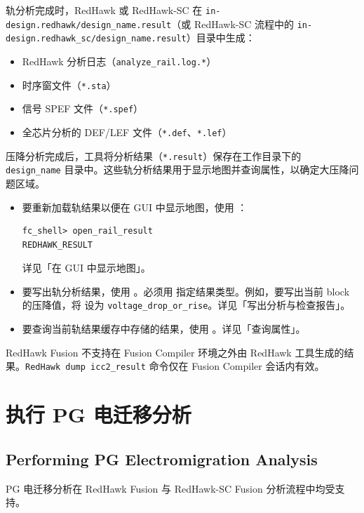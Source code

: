 轨分析完成时，RedHawk 或 RedHawk-SC 在 \texttt{in-design.redhawk/design\_name.result}（或 RedHawk-SC 流程中的 \texttt{in-design.redhawk\_sc/design\_name.result}）目录中生成：
\begin{itemize}
  \item RedHawk 分析日志（\texttt{analyze\_rail.log.*}）
  \item 时序窗文件（\texttt{*.sta}）
  \item 信号 SPEF 文件（\texttt{*.spef}）
  \item 全芯片分析的 DEF/LEF 文件（\texttt{*.def}、\texttt{*.lef}）
\end{itemize}

压降分析完成后，工具将分析结果（\texttt{*.result}）保存在工作目录下的 \texttt{design\_name} 目录中。这些轨分析结果用于显示地图并查询属性，以确定大压降问题区域。

\begin{itemize}
  \item 要重新加载轨结果以便在 GUI 中显示地图，使用 ：
\begin{lstlisting}
fc_shell> open_rail_result
REDHAWK_RESULT
\end{lstlisting}
详见「在 GUI 中显示地图」。
  \item 要写出轨分析结果，使用 。必须用  指定结果类型。例如，要写出当前 block 的压降值，将  设为 \texttt{voltage\_drop\_or\_rise}。详见「写出分析与检查报告」。
  \item 要查询当前轨结果缓存中存储的结果，使用 。详见「查询属性」。
\end{itemize}

\begin{noteBox}
RedHawk Fusion 不支持在 Fusion Compiler 环境之外由 RedHawk 工具生成的结果。\texttt{RedHawk dump icc2\_result} 命令仅在 Fusion Compiler 会话内有效。
\end{noteBox}

\section{执行 PG 电迁移分析}
\subsection*{Performing PG Electromigration Analysis}

\begin{noteBox}
PG 电迁移分析在 RedHawk Fusion 与 RedHawk-SC Fusion 分析流程中均受支持。
\end{noteBox}

